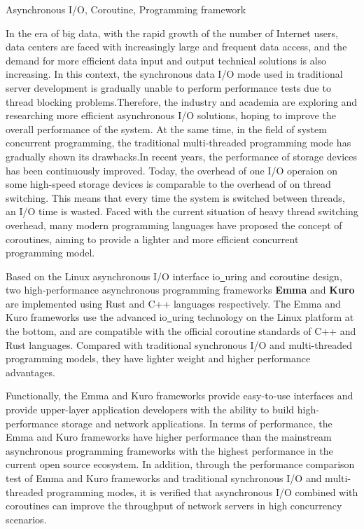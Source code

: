 \documentclass[supercite]{HustGraduPaper}
\theoremstyle{definition}
\begin{document}
\begin{enabstract}{Asynchronous I/O, Coroutine, Programming framework}

In the era of big data, with the rapid growth of the number of Internet users, data centers
are faced with increasingly large and frequent data access, and the demand for more efficient
data input and output technical solutions is also increasing. In this context, the synchronous
data I/O mode used in traditional server development is gradually unable to perform performance
tests due to thread blocking problems.Therefore, the industry and academia are exploring and
researching more efficient asynchronous I/O solutions, hoping to improve the overall performance
of the system.
At the same time, in the field of system concurrent programming, the traditional multi-threaded
programming mode has gradually shown its drawbacks.In recent years, the performance of storage
devices has been continuously improved. Today, the overhead of one I/O operaion on some high-speed
storage devices is comparable to the overhead of on thread switching. This means that every time
the system is switched between threads, an I/O time is wasted. Faced with the current situation
of heavy thread switching overhead, many modern programming languages have proposed the concept
of coroutines, aiming to provide a lighter and more efficient concurrent programming model.\par

Based on the Linux asynchronous I/O interface io\underline{~}uring and coroutine design,
two high-performance asynchronous programming frameworks \textbf{Emma} and \textbf{Kuro} are implemented using Rust and C++ languages respectively.
The Emma and Kuro frameworks use the advanced io\underline{~}uring technology on the Linux platform at the bottom,
and are compatible with the official coroutine standards of C++ and Rust languages.
Compared with traditional synchronous I/O and multi-threaded programming models, they have lighter weight and higher performance advantages.\par

Functionally, the Emma and Kuro frameworks provide easy-to-use interfaces and provide upper-layer application developers
with the ability to build high-performance storage and network applications.
In terms of performance, the Emma and Kuro frameworks have higher performance
than the mainstream asynchronous programming frameworks with the highest performance in the current open source ecosystem.
In addition, through the performance comparison test of Emma and Kuro frameworks and traditional synchronous I/O and multi-threaded programming modes,
it is verified that asynchronous I/O combined with coroutines can improve the throughput of network servers in high concurrency scenarios.\par

\end{enabstract}
\end{document}
